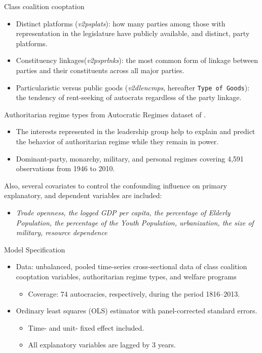 \documentclass{Bredelebeamer}
\begin{document}
\begin{frame}{Class coalition cooptation}
	\begin{itemize}
		\item Distinct platforms (\textit{v2psplats}): how many parties among those with representation in the legislature have publicly available, and distinct, party platforms.
		\item Constituency linkages(\textit{v2psprlnks}): the most common form of linkage between parties and their constituents across all major parties.
		\item Particularistic versus public goods (\textit{v2dlencmps}, hereafter \texttt{Type of Goods}): the tendency of rent-seeking of autocrats regardless of the party linkage.
	\end{itemize}
\end{frame}
\begin{frame}
Authoritarian regime types from Autocratic Regimes dataset of \citet{Geddes2014}.
\begin{itemize}
	\item The interests represented in the leadership group help to explain and predict the behavior of authoritarian regime while they remain in power.
	\item Dominant-party, monarchy, military, and personal regimes covering 4,591 		observations from 1946 to 2010.
\end{itemize}
Also, several covariates to control the confounding influence on primary explanatory, and dependent variables are included:
\begin{itemize}
	\item \textit{Trade openness, the logged GDP per capita, the percentage of Elderly Population, the percentage of the Youth Population, urbanization, the size of military, resource dependence}
\end{itemize}

\end{frame}

\begin{frame}{Model Specification}
\begin{itemize}
	\item Data: unbalanced, pooled time-series cross-sectional data of class coalition cooptation variables, authoritarian regime types, and welfare programs
	\begin{itemize}
		\item Coverage: 74 autocracies, respectively, during the period 1816–2013. 
	\end{itemize}
	\item Ordinary least squares (OLS) estimator with panel-corrected standard errors.
	\begin{itemize}
		\item Time- and unit- fixed effect included.
		\item All explanatory variables are lagged by 3 years.
	\end{itemize}
\end{itemize} 
\end{frame}
\end{document}
